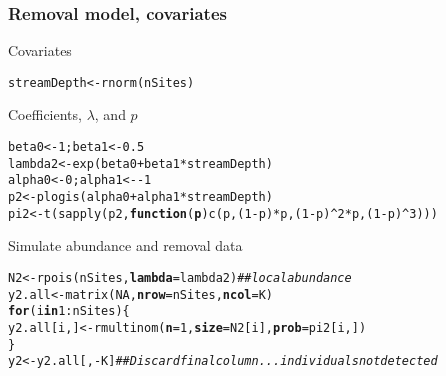 \documentclass[color=usenames,dvipsnames]{beamer}\usepackage[]{graphicx}\usepackage[]{color}
\makeatletter
\newcommand{\hlnum}[1]{\textcolor[rgb]{0.69,0.494,0}{#1}}%
\newcommand{\hlcom}[1]{\textcolor[rgb]{0.514,0.506,0.514}{\textit{#1}}}%
\newcommand{\hlopt}[1]{\textcolor[rgb]{0,0,0}{#1}}%
\newcommand{\hlstd}[1]{\textcolor[rgb]{0,0,0}{#1}}%
\newcommand{\hlkwa}[1]{\textcolor[rgb]{0,0,0}{\textbf{#1}}}%
\newcommand{\hlkwb}[1]{\textcolor[rgb]{0,0.341,0.682}{#1}}%
\newcommand{\hlkwc}[1]{\textcolor[rgb]{0,0,0}{\textbf{#1}}}%
\newcommand{\hlkwd}[1]{\textcolor[rgb]{0.004,0.004,0.506}{#1}}%
\newenvironment{kframe}{%
 \def\at@end@of@kframe{}%
 \ifinner\ifhmode%
  \def\at@end@of@kframe{\end{minipage}}%
  \begin{minipage}{\columnwidth}%
 \fi\fi%
 \def\FrameCommand##1{\hskip\@totalleftmargin \hskip-\fboxsep
 \colorbox{shadecolor}{##1}\hskip-\fboxsep
     \hskip-\linewidth \hskip-\@totalleftmargin \hskip\columnwidth}%
 \MakeFramed {\advance\hsize-\width
   \@totalleftmargin\z@ \linewidth\hsize
   \@setminipage}}%
 {\par\unskip\endMakeFramed%
 \at@end@of@kframe}
\newenvironment{knitrout}{}{} %
\makeatother
\begin{document}
\begin{frame}[fragile]
  \frametitle{Removal model, covariates}
  \small
  Covariates
  \vspace{-6pt}
\begin{knitrout}\scriptsize
{}\color{fgcolor}\begin{kframe}
\begin{alltt}
\hlstd{streamDepth} \hlkwb{<-} \hlkwd{rnorm}\hlstd{(nSites)}
\end{alltt}
\end{kframe}
\end{knitrout}
\vfill
  Coefficients, $\lambda$, and $p$
  \vspace{-6pt}
\begin{knitrout}\scriptsize
{}\color{fgcolor}\begin{kframe}
\begin{alltt}
\hlstd{beta0} \hlkwb{<-} \hlnum{1}\hlstd{; beta1} \hlkwb{<-} \hlnum{0.5}
\hlstd{lambda2} \hlkwb{<-} \hlkwd{exp}\hlstd{(beta0} \hlopt{+} \hlstd{beta1}\hlopt{*}\hlstd{streamDepth)}
\hlstd{alpha0} \hlkwb{<-} \hlnum{0}\hlstd{; alpha1} \hlkwb{<-} \hlopt{-}\hlnum{1}
\hlstd{p2} \hlkwb{<-} \hlkwd{plogis}\hlstd{(alpha0} \hlopt{+} \hlstd{alpha1}\hlopt{*}\hlstd{streamDepth)}
\hlstd{pi2} \hlkwb{<-} \hlkwd{t}\hlstd{(}\hlkwd{sapply}\hlstd{(p2,} \hlkwa{function}\hlstd{(}\hlkwc{p}\hlstd{)} \hlkwd{c}\hlstd{(p, (}\hlnum{1}\hlopt{-}\hlstd{p)}\hlopt{*}\hlstd{p, (}\hlnum{1}\hlopt{-}\hlstd{p)}\hlopt{^}\hlnum{2}\hlopt{*}\hlstd{p, (}\hlnum{1}\hlopt{-}\hlstd{p)}\hlopt{^}\hlnum{3}\hlstd{)))}
\end{alltt}
\end{kframe}
\end{knitrout}
\vfill
  Simulate abundance and removal data
  \vspace{-6pt}
\begin{knitrout}\scriptsize
{}\color{fgcolor}\begin{kframe}
\begin{alltt}
\hlstd{N2} \hlkwb{<-} \hlkwd{rpois}\hlstd{(nSites,} \hlkwc{lambda}\hlstd{=lambda2)}         \hlcom{## local abundance }
\hlstd{y2.all} \hlkwb{<-} \hlkwd{matrix}\hlstd{(}\hlnum{NA}\hlstd{,} \hlkwc{nrow}\hlstd{=nSites,} \hlkwc{ncol}\hlstd{=K)}
\hlkwa{for}\hlstd{(i} \hlkwa{in} \hlnum{1}\hlopt{:}\hlstd{nSites) \{}
    \hlstd{y2.all[i,]} \hlkwb{<-} \hlkwd{rmultinom}\hlstd{(}\hlkwc{n}\hlstd{=}\hlnum{1}\hlstd{,} \hlkwc{size}\hlstd{=N2[i],} \hlkwc{prob}\hlstd{=pi2[i,])}
\hlstd{\}}
\hlstd{y2} \hlkwb{<-} \hlstd{y2.all[,}\hlopt{-}\hlstd{K]} \hlcom{## Discard final column... individuals not detected}
\end{alltt}
\end{kframe}
\end{knitrout}
\end{frame}
\end{document}
